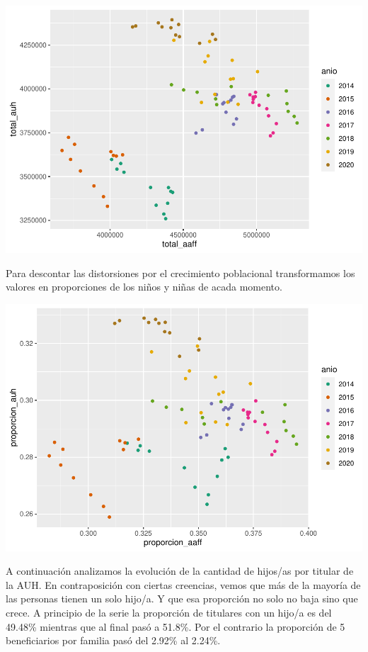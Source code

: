 \documentclass[
  12,
]{article}
\begin{document}
\includegraphics{Grupo4_Final_files/figure-latex/grafico_correlacion_auh_aaff-1.pdf}

Para descontar las distorsiones por el crecimiento poblacional
transformamos los valores en proporciones de los niños y niñas de acada
momento.

\includegraphics{Grupo4_Final_files/figure-latex/grafico_correlacion_auh_aaff_proporcion-1.pdf}

A continuación analizamos la evolución de la cantidad de hijos/as por
titular de la AUH. En contraposición con ciertas creencias, vemos que
más de la mayoría de las personas tienen un solo hijo/a. Y que esa
proporción no solo no baja sino que crece. A principio de la serie la
proporción de titulares con un hijo/a es del 49.48\% mientras que al
final pasó a 51.8\%. Por el contrario la proporción de 5 beneficiarios
por familia pasó del 2.92\% al 2.24\%.
\end{document}
